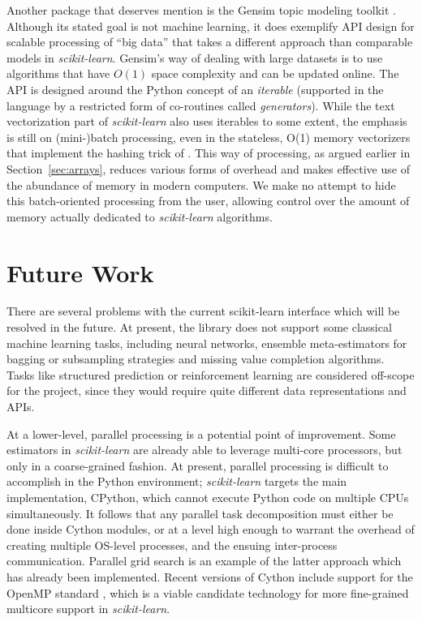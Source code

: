 \documentclass{llncs}
\newcommand{\sklearn}{\textit{scikit-learn}\xspace}
\begin{document}
Another package that deserves mention is the Gensim topic modeling toolkit
\citep{rehurek2010gensim}.
Although its stated goal is not machine learning,
it does exemplify API design for scalable processing of ``big data''
that takes a different approach than comparable models in \sklearn.
Gensim's way of dealing with large datasets is to use algorithms
that have $O(1)$ space complexity and can be updated online.
The API is designed around the Python concept of an \textit{iterable}
(supported in the language by a restricted form of co-routines called
\textit{generators}).
While the text vectorization part of \sklearn
also uses iterables to some extent,
the emphasis is still on (mini-)batch processing,
even in the stateless, O(1) memory vectorizers
that implement the hashing trick of \citet{weinberger2009}.
This way of processing, as argued earlier in Section~\ref{sec:arrays},
reduces various forms of overhead
and makes effective use of the abundance of memory in modern computers.
We make no attempt to hide this batch-oriented processing from the user,
allowing control over the amount of memory actually dedicated
to \sklearn algorithms.

\section{Future Work}
\label{sec:future_work}
There are several problems with the current scikit-learn interface which
will be resolved in the future.
At present, the library does not support some classical machine learning tasks,
including neural networks, ensemble meta-estimators for
bagging or subsampling strategies and missing value completion algorithms.
Tasks like structured prediction or reinforcement learning are
considered off-scope for the project, since they would require quite different
data representations and APIs.

At a lower-level, parallel processing is a potential point of improvement.
Some estimators in \sklearn are already able to leverage multi-core processors,
but only in a coarse-grained fashion.
At present, parallel processing is difficult to accomplish in the Python environment;
\sklearn targets the main implementation, CPython,
which cannot execute Python code on multiple CPUs simultaneously.
It follows that any parallel task decomposition must either be done
inside Cython modules,
or at a level high enough to warrant the overhead
of creating multiple OS-level processes,
and the ensuing inter-process communication.
Parallel grid search is an example of the latter approach
which has already been implemented.
Recent versions of Cython include support for the OpenMP standard
\citep{dagum1998openmp},
which is a viable candidate technology
for more fine-grained multicore support in \sklearn.
\end{document}
